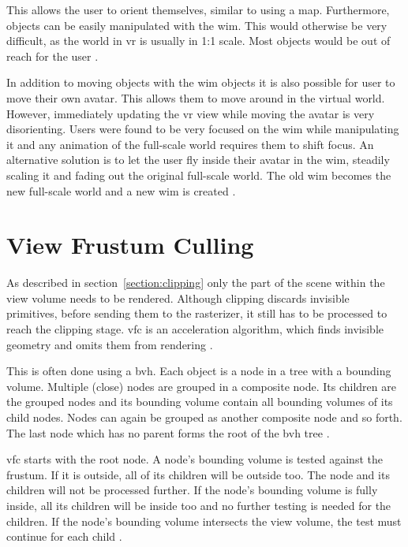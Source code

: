 This allows the user to orient themselves, similar to using a map. Furthermore, objects can be easily manipulated with the \gls{wim}. This would otherwise be very difficult, as the world in \gls{vr} is usually in 1:1 scale. Most objects would be out of reach for the user \cite{stoakley:1995:virtual}.

In addition to moving objects with the \gls{wim} objects it is also possible for user to move their own avatar. This allows them to move around in the virtual world. However, immediately updating the \gls{vr} view while moving the avatar is very disorienting. Users were found to be very focused on the \gls{wim} while manipulating it and any animation of the full-scale world requires them to shift focus. An alternative solution is to let the user fly inside their avatar in the \gls{wim}, steadily scaling it and fading out the original full-scale world. The old \gls{wim} becomes the new full-scale world and a new \gls{wim} is created \cite{pausch:1995:navigation}.




\section{View Frustum Culling}
As described in section~\ref{section:clipping} only the part of the scene within the view volume needs to be rendered. Although clipping discards invisible primitives, before sending them to the rasterizer, it still has to be processed to reach the clipping stage. \Gls{vfc} is an acceleration algorithm, which finds invisible geometry and omits them from rendering \cite{assarsson:2000:optimized, akine:2018:realtime}.

This is often done using a \gls{bvh}. Each object is a node in a tree with a bounding volume. Multiple (close) nodes are grouped in a composite node. Its children are the grouped nodes and its bounding volume contain all bounding volumes of its child nodes. Nodes can again be grouped as another composite node and so forth. The last node which has no parent forms the root of the \gls{bvh} tree \cite{clark:1976:hierarchical, assarsson:2000:optimized, akine:2018:realtime}.

\Gls{vfc} starts with the root node. A node's bounding volume is tested against the frustum. If it is outside, all of its children will be outside too. The node and its children will not be processed further. If the node's bounding volume is fully inside, all its children will be inside too and no further testing is needed for the children. If the node's bounding volume intersects the view volume, the test must continue for each child \cite{akine:2018:realtime}.

